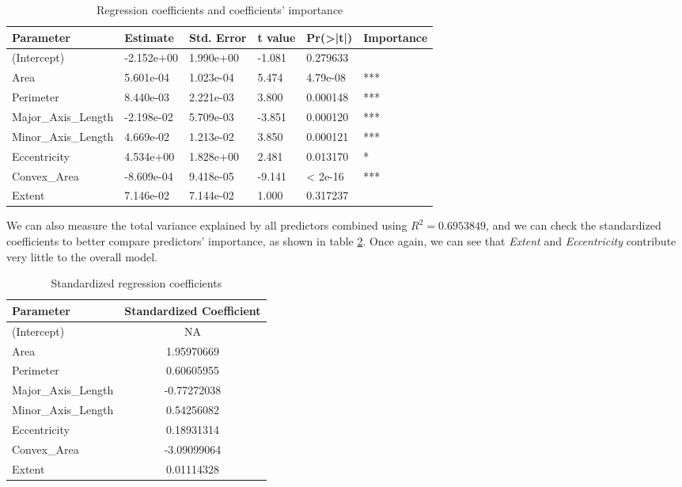 \begin{table}
  \centering
  \caption{Regression coefficients and coefficients' importance}
  \label{tab:regression_coefficients}
  \begin{tabularx}{\textwidth}{lXXXXX}
    \toprule
    Parameter & Estimate & Std. Error & t value & Pr(>|t|) & Importance\\
    \midrule
    (Intercept)       & -2.152e+00 & 1.990e+00 & -1.081 & 0.279633 &  \\
    Area              &  5.601e-04 & 1.023e-04 &  5.474 & 4.79e-08 & *** \\
    Perimeter         &  8.440e-03 & 2.221e-03 &  3.800 & 0.000148 & *** \\
    Major\_Axis\_Length & -2.198e-02 & 5.709e-03 & -3.851 & 0.000120 & *** \\
    Minor\_Axis\_Length &  4.669e-02 & 1.213e-02 &  3.850 & 0.000121 & *** \\
    Eccentricity      &  4.534e+00 & 1.828e+00 &  2.481 & 0.013170 & * \\
    Convex\_Area       & -8.609e-04 & 9.418e-05 & -9.141 & < 2e-16 & *** \\
    Extent            &  7.146e-02 & 7.144e-02 &  1.000 & 0.317237 &  \\
    \bottomrule
  \end{tabularx}
\end{table}

We can also measure the total variance explained by all predictors combined using $R^2 = 0.6953849$, and we can check the standardized coefficients to better compare predictors' importance, as shown in table \ref{tab:standardized_coefficients}. Once again, we can see that \textit{Extent} and \textit{Eccentricity} contribute very little to the overall model.

\begin{table}
  \centering
  \caption{Standardized regression coefficients}
  \label{tab:standardized_coefficients}
  \begin{tabularx}{0.45\textwidth}{lc}
    \toprule
    Parameter & Standardized Coefficient \\
    \midrule
    (Intercept)       & NA \\
    Area              & 1.95970669 \\
    Perimeter         & 0.60605955 \\
    Major\_Axis\_Length & -0.77272038 \\
    Minor\_Axis\_Length & 0.54256082 \\
    Eccentricity      & 0.18931314 \\
    Convex\_Area       & -3.09099064 \\
    Extent            & 0.01114328 \\
    \bottomrule
  \end{tabularx}
\end{table}

